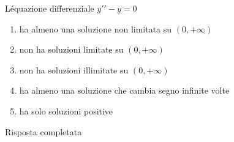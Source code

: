 \begin{quiz}
L\'equazione differenziale $y\prime\prime-y=0$
\begin{enumerate}
\item ha almeno una soluzione non limitata su $(0,+\infty)$
\item non ha soluzioni limitate su $(0,+\infty)$
\item non ha soluzioni illimitate su $(0,+\infty)$
\item ha almeno una soluzione che cambia segno infinite volte
\item ha solo soluzioni positive
\end{enumerate}
\end{quiz}
Risposta completata
